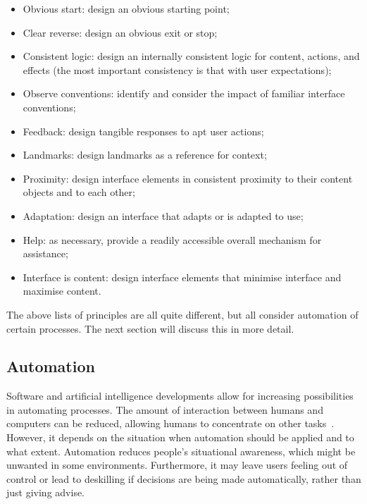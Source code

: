 \begin{itemize}[noitemsep,topsep=0pt,parsep=0pt,partopsep=0pt]
\item Obvious start: design an obvious starting point;
\item Clear reverse: design an obvious exit or stop;
\item Consistent logic: design an internally consistent logic for content, actions, and effects (the most important consistency is that with user expectations);
\item Observe conventions: identify and consider the impact of familiar interface conventions;
\item Feedback: design tangible responses to apt user actions;
\item Landmarks: design landmarks as a reference for context;
\item Proximity: design interface elements in consistent proximity to their content objects and to each other;
\item Adaptation: design an interface that adapts or is adapted to use;
\item Help: as necessary, provide a readily accessible overall mechanism for assistance;
\item Interface is content: design interface elements that minimise interface and maximise content.
\end{itemize}

The above lists of principles are all quite different, but all consider automation of certain processes. The next section will discuss this in more detail.

\subsection{Automation}
Software and artificial intelligence developments allow for increasing possibilities in automating processes. The amount of interaction between humans and computers can be reduced, allowing humans to concentrate on other tasks~\cite{payne2000varying}. However, it depends on the situation when automation should be applied and to what extent. Automation reduces people's situational awareness, which might be unwanted in some environments. Furthermore, it may leave users feeling out of control or lead to deskilling if decisions are being made automatically, rather than just giving advise.

